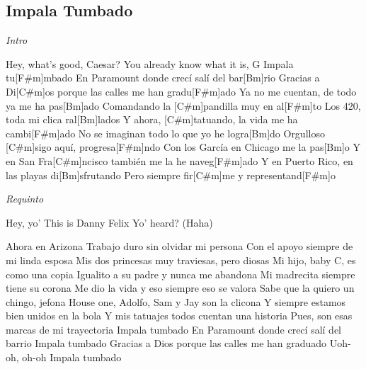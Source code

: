 \subsection{Impala Tumbado}
\noindent

\vspace{1cm}

\begin{guitar}
	\begin{multicols}{2}
		\textit{Intro}
		\par

		Hey, what's good, Caesar?
		You already know what it is, G
		Impala tu[F#m]mbado
		En Paramount donde crecí salí del bar[Bm]rio
		Gracias a Di[C#m]os porque las calles me han gradu[F#m]ado
		Ya no me cuentan, de todo ya me ha pas[Bm]ado
		Comandando la [C#m]pandilla muy en al[F#m]to
		Los 420, toda mi clica ral[Bm]lados
		Y ahora, [C#m]tatuando, la vida me ha cambi[F#m]ado
		No se imaginan todo lo que yo he logra[Bm]do
		Orgulloso [C#m]sigo aquí, progresa[F#m]ndo
		Con los García en Chicago me la pas[Bm]o
		Y en San Fra[C#m]ncisco también me la he naveg[F#m]ado
		Y en Puerto Rico, en las playas di[Bm]sfrutando
		Pero siempre fir[C#m]me y representand[F#m]o
		\par
		\textit{Requinto}
		\par
		Hey, yo'
		This is Danny Felix
		Yo' heard? (Haha)
		\par
		Ahora en Arizona
		Trabajo duro sin olvidar mi persona
		Con el apoyo siempre de mi linda esposa
		Mis dos princesas muy traviesas, pero diosas
		Mi hijo, baby C, es como una copia
		Igualito a su padre y nunca me abandona
		Mi madrecita siempre tiene su corona
		Me dio la vida y eso siempre eso se valora
		Sabe que la quiero un chingo, jefona
		House one, Adolfo, Sam y Jay son la clicona
		Y siempre estamos bien unidos en la bola
		Y mis tatuajes todos cuentan una historia
		Pues, son esas marcas de mi trayectoria
		Impala tumbado
		En Paramount donde crecí salí del barrio
		Impala tumbado
		Gracias a Dios porque las calles me han graduado
		Uoh-oh, oh-oh
		Impala tumbado

	\end{multicols}
\end{guitar}
